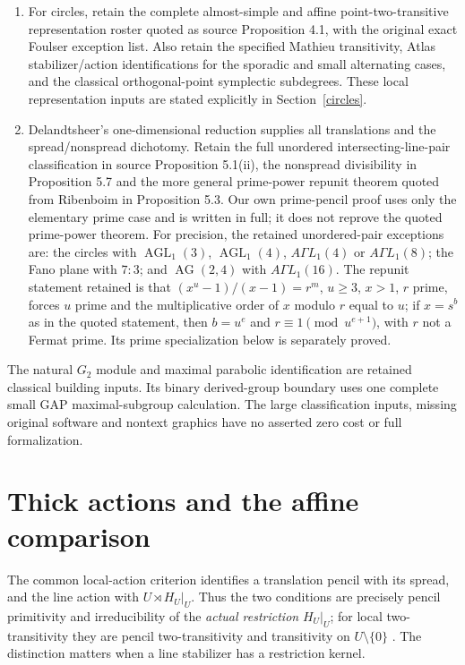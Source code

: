 \documentclass[11pt,a4paper]{article}
\begin{document}
\begin{enumerate}
and $\operatorname{P\Gamma U}_3(q)$, with the classical natural
models. Their required local actions are proved in the common paper,
including the small-parameter exceptions to the source assertions.
\item For circles, retain the complete almost-simple and affine
point-two-transitive representation roster quoted as source
Proposition 4.1, with the original exact Foulser exception list. Also
retain the specified Mathieu transitivity, Atlas stabilizer/action
identifications for the sporadic and small alternating cases, and the
classical orthogonal-point symplectic subdegrees. These local
representation inputs are stated explicitly in Section~\ref{circles}.
\item Delandtsheer's one-dimensional reduction supplies all translations
and the spread/nonspread dichotomy. Retain the full unordered
intersecting-line-pair classification in source Proposition 5.1(ii),
the nonspread divisibility in Proposition 5.7 and the more general
prime-power repunit theorem quoted from Ribenboim in Proposition 5.3.
Our own prime-pencil proof uses only the elementary prime case and
is written in full; it does not reprove the quoted prime-power theorem.
For precision, the retained unordered-pair exceptions are: the circles
with $\operatorname{AGL}_1(3)$, $\operatorname{AGL}_1(4)$,
$A\Gamma L_1(4)$ or $A\Gamma L_1(8)$; the Fano plane with $7:3$;
and $\operatorname{AG}(2,4)$ with $A\Gamma L_1(16)$.
The repunit statement retained is that
$(x^u-1)/(x-1)=r^m$, $u\geq3$, $x>1$, $r$ prime, forces $u$
prime and the multiplicative order of $x$ modulo $r$ equal to $u$;
if $x=s^b$ as in the quoted statement, then $b=u^e$ and
$r\equiv1\pmod{u^{e+1}}$, with $r$ not a Fermat prime.
Its prime specialization below is separately proved.
\end{enumerate}
The natural $G_2$ module and maximal parabolic identification are retained
classical building inputs. Its binary derived-group boundary uses one
complete small GAP maximal-subgroup calculation. The large classification
inputs, missing original software and nontext graphics have no asserted
zero cost or full formalization.

\section{Thick actions and the affine comparison}
The common local-action criterion identifies a translation pencil with
its spread, and the line action with $U\rtimes H_U|_U$. Thus the two
conditions are precisely pencil primitivity and irreducibility of the
\emph{actual restriction} $H_U|_U$; for local two-transitivity they
are pencil two-transitivity and transitivity on $U\setminus\{0\}$
\cite[Proposition~\ref{U-translation}]{U}.
The distinction matters when a line stabilizer has a restriction kernel.
\end{document}
